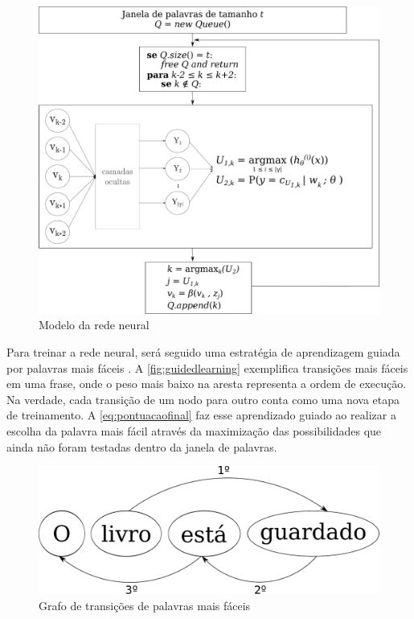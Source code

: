 \begin{figure}[htb]
    \caption{Modelo da rede neural}\label{fig:neuralnetworkfinal}
    \begin{center}
        \includegraphics[scale=0.25]{img/neuralnetworkfinal_alg2.pdf}
    \end{center}
\end{figure}

Para treinar a rede neural, será seguido uma estratégia de aprendizagem guiada por palavras mais fáceis \cite{shen2007guided}. A \autoref{fig:guidedlearning} exemplifica transições mais fáceis em uma frase, onde o peso mais baixo na aresta representa a ordem de execução. Na verdade, cada transição de um nodo para outro conta como uma nova etapa de treinamento. A \autoref{eq:pontuacaofinal} faz esse aprendizado guiado ao realizar a escolha da palavra mais fácil através da maximização das possibilidades que ainda não foram testadas dentro da janela de palavras.

\begin{figure}[htb]
	  \caption{Grafo de transições de palavras mais fáceis}\label{fig:guidedlearning}
	  \begin{center}
	      \includegraphics[scale=0.3]{img/guidedlearning.pdf}
	  \end{center}
\end{figure}

